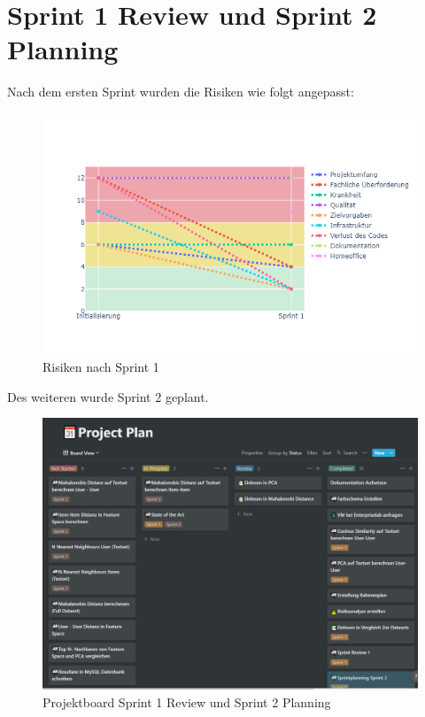 \section*{Sprint 1 Review und Sprint 2 Planning}
Nach dem ersten Sprint wurden die Risiken wie folgt angepasst:
\begin{figure}[htb]
	\centering
	\includegraphics[keepaspectratio,width=\linewidth]{img/Risiken Sprint1.png}
	\caption{Risiken nach Sprint 1}
	\label{fig:Sprint 1 Risiken}
\end{figure}
Des weiteren wurde Sprint 2 geplant. 
\begin{figure}[htb]
	\centering
	\includegraphics[keepaspectratio,width=\linewidth]{img/Projektboard Review Sprint1 Planning Sprint2.png}
	\caption{Projektboard Sprint 1 Review und Sprint 2 Planning}
	\label{fig:Sprint 1 Review}
\end{figure}

